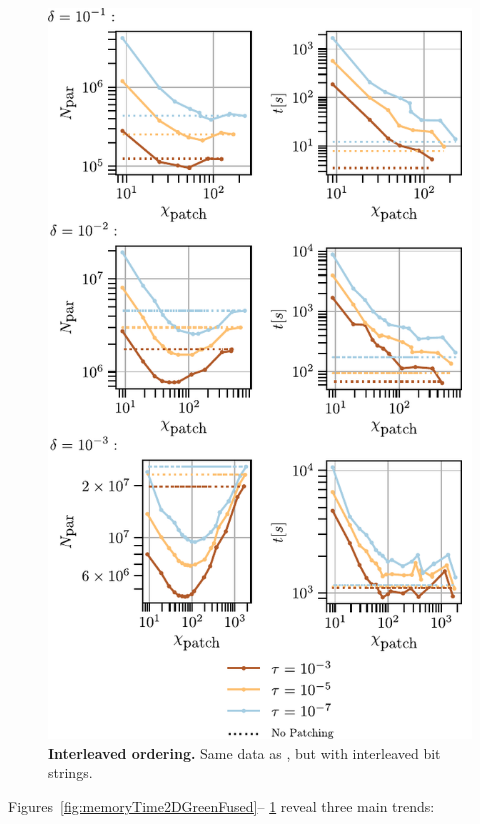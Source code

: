 \begin{figure}[ht!]
    \centering
    \includegraphics{figures/2DGreenMemoryTimeInterleaved.pdf}
    \caption{\textbf{Interleaved ordering.}
    Same data as , but with
    interleaved bit strings.}
    \label{fig:memoryTime2DGreenInterleaved}
\end{figure}

Figures~\ref{fig:memoryTime2DGreenFused}–
\ref{fig:memoryTime2DGreenInterleaved} reveal three main trends:

